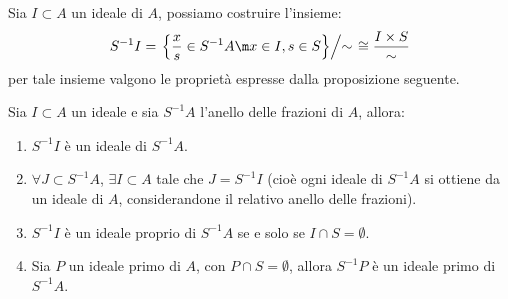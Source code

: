 \documentclass[11pt]{scrartcl}
\begin{document}
\begin{remark}
    [Ideali di $S^{-1}A$]
    Sia $I \subset A$ un ideale di $A$, possiamo costruire l'insieme:
    \[ S^{-1}I = \left.\left\{\frac{x}{s} \in S^{-1}A \m x \in I, s \in S \right\}\middle/ \sim \right.\cong \frac{I \times S}{\sim}
        \]
    per tale insieme valgono le proprietà espresse dalla proposizione seguente.
\end{remark}

\begin{proposition}
    [Ideali di $S^{-1}A$]
    Sia $I \subset A$ un ideale e sia $S^{-1}A$ l'anello delle frazioni di $A$, allora:
    \begin{enumerate}[(1)]
        \item $S^{-1}I$ è un ideale di $S^{-1}A$.
        \item $\forall J \subset S^{-1}A$, $\exists I \subset A$ tale che $J = S^{-1}I$ (cioè ogni ideale di $S^{-1}A$ si ottiene da un ideale di $A$, considerandone il relativo anello delle frazioni).
        \item $S^{-1}I$ è un ideale proprio di $S^{-1}A$ se e solo se $I \cap S = \emptyset$.
        \item Sia $P$ un ideale primo di $A$, con $P \cap S = \emptyset$, allora $S^{-1}P$ è un ideale primo di $S^{-1}A$.
    \end{enumerate}
\end{proposition}
\end{document}
